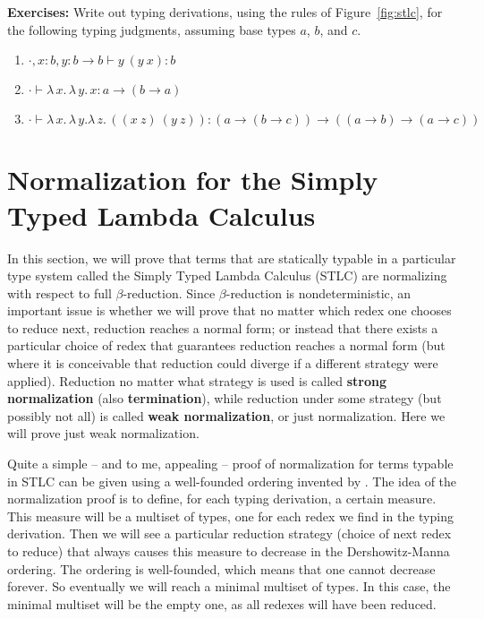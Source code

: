 \documentclass{article}
\begin{document}
\textbf{Exercises:} Write out typing derivations, using the rules of Figure~\ref{fig:stlc}, for
  the following typing judgments, assuming base types $a$, $b$, and $c$.
  \begin{enumerate}
  \item $\cdot, x:b, y : b\to b \vdash y\ (y\ x) : b$
  \item $\cdot \vdash \lambda\,x.\,\lambda\,y.\,x : a \to (b \to a)$
  \item $\cdot \vdash \lambda\,x.\,\lambda\,y.\lambda\,z.\,((x\ z)\ (y\ z)) : (a \to (b \to c)) \to ((a \to b) \to (a \to c))$
  \end{enumerate}

\section{Normalization for the Simply Typed Lambda Calculus}

In this section, we will prove that terms that are statically typable
in a particular type system called the Simply Typed Lambda Calculus
(STLC) are normalizing with respect to full $\beta$-reduction.  Since
$\beta$-reduction is nondeterministic, an important issue is whether
we will prove that no matter which redex one chooses to reduce next,
reduction reaches a normal form; or instead that there exists a
particular choice of redex that guarantees reduction reaches a normal
form (but where it is conceivable that reduction could diverge if a
different strategy were applied).  Reduction no matter what strategy
is used is called \textbf{strong normalization} (also
\textbf{termination}), while reduction under some strategy (but
possibly not all) is called \textbf{weak normalization}, or just
normalization.  Here we will prove just weak normalization.

Quite a simple -- and to me, appealing -- proof of normalization for
terms typable in STLC can be given using a well-founded ordering
invented by \citet{dm79}.  The idea of the
normalization proof is to define, for each typing derivation, a
certain measure.  This measure will be a multiset of types, one for
each redex we find in the typing derivation.  Then we will see a
particular reduction strategy (choice of next redex to reduce) that
always causes this measure to decrease in the Dershowitz-Manna
ordering.  The ordering is well-founded, which means that one cannot
decrease forever.  So eventually we will reach a minimal multiset of
types.  In this case, the minimal multiset will be the empty one, as
all redexes will have been reduced.
\end{document}
